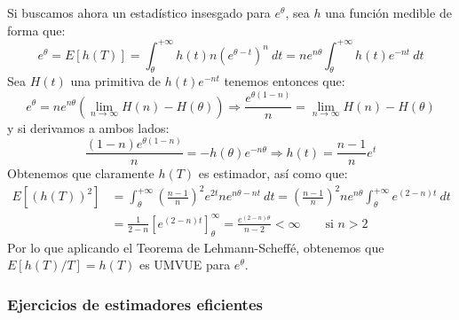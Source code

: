 \begin{ejercicio}
    \noindent
    Si buscamos ahora un estadístico insesgado para $e^\theta$, sea $h$ una función medible de forma que:
    \begin{equation*}
        e^\theta = E[h(T)] = \int_{\theta}^{+\infty} h(t)n{(e^{\theta-t})}^{n}~dt = ne^{n\theta}\int_{\theta}^{+\infty}h(t)e^{-nt} ~dt
    \end{equation*}
    Sea $H(t)$ una primitiva de $h(t)e^{-nt}$ tenemos entonces que:
    \begin{equation*}
        e^\theta = ne^{n\theta} \left(\lim_{n\to\infty}H(n)-H(\theta) \right) \Longrightarrow \frac{e^{\theta(1-n)}}{n}=\lim_{n\to\infty}H(n)-H(\theta) 
    \end{equation*}
    y si derivamos a ambos lados:
    \begin{equation*}
        \frac{(1-n)e^{\theta(1-n)}}{n} = -h(\theta) e^{-n\theta} \Longrightarrow h(t) = \frac{n-1}{n}e^t
    \end{equation*}
    Obtenemos que claramente $h(T)$ es estimador, así como que:
    \begin{align*}
        E[{(h(T))}^{2}] &= \int_{\theta}^{+\infty} {\left(\frac{n-1}{n}\right)}^{2} e^{2t}ne^{n\theta-nt}~dt  = {\left(\frac{n-1}{n}\right)}^{2}ne^{n\theta} \int_{\theta}^{+\infty} e^{(2-n)t}~dt  \\
                        &= \frac{1}{2-n}\left[e^{(2-n)t}\right]_\theta^\infty = \frac{e^{(2-n)\theta}}{n-2} < \infty \qquad \text{si\ } n>2
    \end{align*}
    Por lo que aplicando el Teorema de Lehmann-Scheffé, obtenemos que $E[h(T)/T] = h(T)$ es UMVUE para $e^{\theta}$.
\end{ejercicio}

\subsubsection{Ejercicios de estimadores eficientes}

